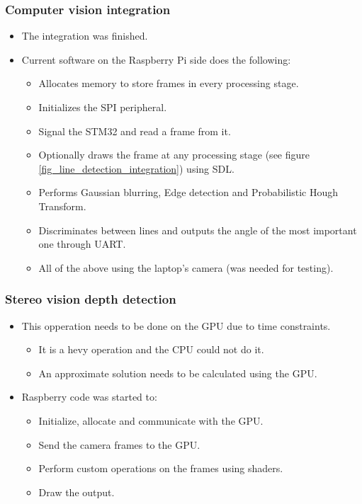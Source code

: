 \subsubsection{Computer vision integration}
\begin{itemize}
	\item The integration was finished.
	\item Current software on the Raspberry Pi side does the following:
	\begin{itemize}
		\item Allocates memory to store frames in every processing stage.
		\item Initializes the SPI peripheral.
		\item Signal the STM32 and read a frame from it.
		\item Optionally draws the frame at any processing stage (see figure \ref{fig_line_detection_integration}) using SDL.
		\item Performs Gaussian blurring, Edge detection and Probabilistic Hough Transform.
		\item Discriminates between lines and outputs the angle of the most important one through UART.
		\item All of the above using the laptop's camera (was needed for testing).
	\end{itemize}
\end{itemize}



\subsubsection{Stereo vision depth detection}
\begin{itemize}
	\item This opperation needs to be done on the GPU due to time constraints.
	\begin{itemize}
		\item It is a hevy operation and the CPU could not do it.
		\item An approximate solution needs to be calculated using the GPU.
	\end{itemize}
	\item Raspberry code was started to:
	\begin{itemize}
		\item Initialize, allocate and communicate with the GPU.
		\item Send the camera frames to the GPU.
		\item Perform custom operations on the frames using shaders.
		\item Draw the output.
	\end{itemize}
\end{itemize}
